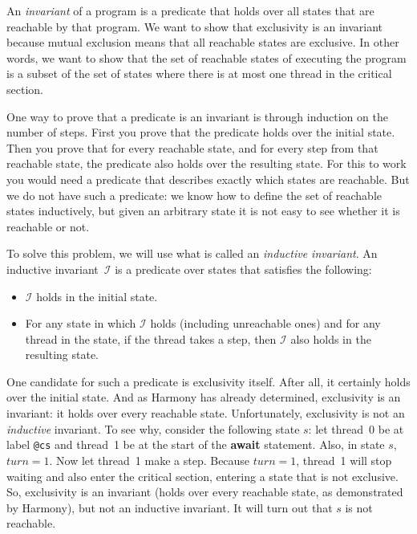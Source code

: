 \documentclass{report}
\begin{document}
An \emph{invariant} of a program
%
is a predicate that holds over all states that are reachable by that program.
We want to show that exclusivity is an invariant because mutual exclusion means
that all reachable states are exclusive.
In other words, we want to show that the set of reachable states of executing
the program
is a subset of the set of states where there is at most one thread in the critical
section.

One way to prove that a predicate is an invariant is through induction
on the number of steps.  First you prove that the predicate holds over
the initial state.  Then you prove that for every reachable state,
and for every step from that reachable state, the predicate also holds
over the resulting state.
For this to work you would need a predicate that describes exactly which
states are reachable.
But we do not have such a predicate: we know how to define the set
of reachable states inductively, but given an arbitrary state it is not
easy to see whether it is reachable or not.

To solve this problem, we will use what is called an
\emph{inductive invariant}.
%
An inductive invariant~$\mathcal{I}$ is a predicate over states that satisfies the following:
\begin{itemize}
\item $\mathcal{I}$ holds in the initial state.
\item For any state in which $\mathcal{I}$ holds (including unreachable ones) and for any
thread in the state, if the thread takes a step, then $\mathcal{I}$ also holds in the
resulting state.
\end{itemize}

One candidate for such a predicate is exclusivity itself.
After all, it certainly holds over the initial state.
And as Harmony has already determined, exclusivity is an invariant:
it holds over every reachable state.
Unfortunately, exclusivity is not an \emph{inductive} invariant.
To see why, consider the following state $s$: let thread~0 be at label \texttt{@cs}
and thread~1 be at the start of the \textbf{await} statement.
Also, in state $s$, $\mathit{turn} = 1$.  Now let
thread~1 make a step.  Because $\mathit{turn} = 1$,
thread~1 will stop waiting and also enter the critical
section, entering a state that is not exclusive.
So, exclusivity is an invariant (holds over every reachable state, as demonstrated
by Harmony),
but not an inductive invariant.
It will turn out that $s$ is not reachable.
\end{document}
